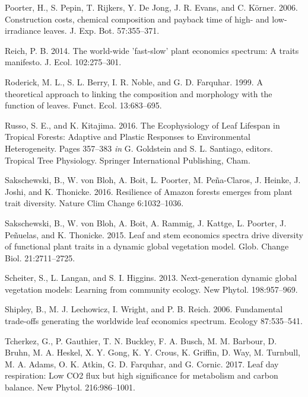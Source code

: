 \documentclass[
  12pt,
]{article}
\newlength{\cslhangindent}
\newenvironment{cslreferences}%
  {\setlength{\parindent}{0pt}%
  \everypar{\setlength{\hangindent}{\cslhangindent}}\ignorespaces}%
  {\par}
\begin{document}
\begin{cslreferences}
\leavevmode\hypertarget{ref-Poorter2006b}{}%
Poorter, H., S. Pepin, T. Rijkers, Y. De Jong, J. R. Evans, and C. Körner. 2006. Construction costs, chemical composition and payback time of high- and low-irradiance leaves. J. Exp. Bot. 57:355--371.

\leavevmode\hypertarget{ref-Reich2014}{}%
Reich, P. B. 2014. The world-wide 'fast-slow' plant economics spectrum: A traits manifesto. J. Ecol. 102:275--301.

\leavevmode\hypertarget{ref-Roderick1999}{}%
Roderick, M. L., S. L. Berry, I. R. Noble, and G. D. Farquhar. 1999. A theoretical approach to linking the composition and morphology with the function of leaves. Funct. Ecol. 13:683--695.

\leavevmode\hypertarget{ref-Russo2016}{}%
Russo, S. E., and K. Kitajima. 2016. The Ecophysiology of Leaf Lifespan in Tropical Forests: Adaptive and Plastic Responses to Environmental Heterogeneity. Pages 357--383 \emph{in} G. Goldstein and S. L. Santiago, editors. Tropical Tree Physiology. Springer International Publishing, Cham.

\leavevmode\hypertarget{ref-Sakschewski2016}{}%
Sakschewski, B., W. von Bloh, A. Boit, L. Poorter, M. Peña-Claros, J. Heinke, J. Joshi, and K. Thonicke. 2016. Resilience of Amazon forests emerges from plant trait diversity. Nature Clim Change 6:1032--1036.

\leavevmode\hypertarget{ref-Sakschewski2015}{}%
Sakschewski, B., W. von Bloh, A. Boit, A. Rammig, J. Kattge, L. Poorter, J. Peñuelas, and K. Thonicke. 2015. Leaf and stem economics spectra drive diversity of functional plant traits in a dynamic global vegetation model. Glob. Change Biol. 21:2711--2725.

\leavevmode\hypertarget{ref-Scheiter2013}{}%
Scheiter, S., L. Langan, and S. I. Higgins. 2013. Next-generation dynamic global vegetation models: Learning from community ecology. New Phytol. 198:957--969.

\leavevmode\hypertarget{ref-Shipley2006}{}%
Shipley, B., M. J. Lechowicz, I. Wright, and P. B. Reich. 2006. Fundamental trade-offs generating the worldwide leaf economics spectrum. Ecology 87:535--541.

\leavevmode\hypertarget{ref-Tcherkez2017}{}%
Tcherkez, G., P. Gauthier, T. N. Buckley, F. A. Busch, M. M. Barbour, D. Bruhn, M. A. Heskel, X. Y. Gong, K. Y. Crous, K. Griffin, D. Way, M. Turnbull, M. A. Adams, O. K. Atkin, G. D. Farquhar, and G. Cornic. 2017. Leaf day respiration: Low CO2 flux but high significance for metabolism and carbon balance. New Phytol. 216:986--1001.


\end{cslreferences}
\end{document}

